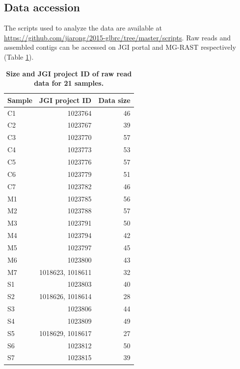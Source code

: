 \documentclass[]{msu-thesis}
\begin{document}
\subsection{Data accession}
The scripts used to analyze the data are available at
\url{https://github.com/jiarong/2015-glbrc/tree/master/scripts}. Raw
reads and assembled contigs can be accessed on JGI portal and MG-RAST
respectively (Table \ref{tab:chap4TabS1}).

\begin{table}[htbp] 
  \centering 
  \caption[Size and JGI project ID of raw read data for 21
  samples]{\textbf{Size and JGI project ID of raw read data for 21
  samples.}}
  \begin{tabular}{|lrr|} 
    \toprule 
    Sample & \multicolumn{1}{l}{JGI project ID} & \multicolumn{1}{l|}{Data size} \\ 
    \midrule 
    C1    & 1023764 & 46 \\ 
    C2    & 1023767 & 39 \\ 
    C3    & 1023770 & 57 \\ 
    C4    & 1023773 & 53 \\ 
    C5    & 1023776 & 57 \\ 
    C6    & 1023779 & 51 \\ 
    C7    & 1023782 & 46 \\ 
    M1    & 1023785 & 56 \\ 
    M2    & 1023788 & 57 \\ 
    M3    & 1023791 & 50 \\ 
    M4    & 1023794 & 42 \\ 
    M5    & 1023797 & 45 \\ 
    M6    & 1023800 & 43 \\ 
    M7    & \multicolumn{1}{l}{1018623, 1018611} & 32 \\ 
    S1    & 1023803 & 40 \\ 
    S2    & \multicolumn{1}{l}{1018626, 1018614} & 28 \\ 
    S3    & 1023806 & 44 \\ 
    S4    & 1023809 & 49 \\ 
    S5    & \multicolumn{1}{l}{1018629, 1018617} & 27 \\ 
    S6    & 1023812 & 50 \\ 
    S7    & 1023815 & 39 \\ 
    \bottomrule 
    \end{tabular}%
  \label{tab:chap4TabS1}%
\end{table}%
\end{document}
